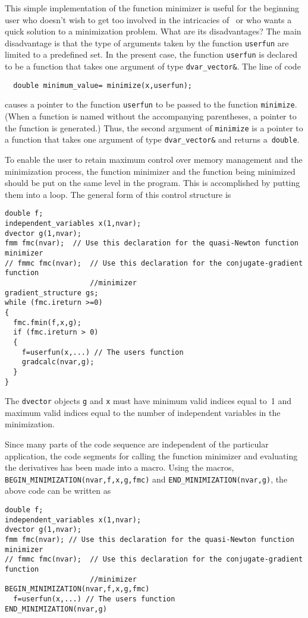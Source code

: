 \documentclass{admbmanual}
\begin{document}
This simple implementation of the function minimizer 
is useful for the beginning user who 
doesn't wish to get too involved in the intricacies of \scAD\ or
who wants a quick solution to a minimization problem. What are its
disadvantages? 
The main disadvantage is that the type of arguments taken by the function
\texttt{userfun} are limited to a predefined set. In the present case, the
function \texttt{userfun} is declared to be a function that takes
one argument of type \texttt{dvar\_vector\&}. The line of code 
\begin{lstlisting}
  double minimum_value= minimize(x,userfun);
\end{lstlisting}
causes a pointer to the function \texttt{userfun} to be passed
to the function \texttt{minimize}.  (When a function is named without the
accompanying parentheses, a pointer to the function is generated.)
Thus, the second argument of \texttt{minimize} is a pointer to
a function that takes one argument of type \texttt{dvar\_vector\&}
and returns a~\texttt{double}.

To enable the user to retain maximum control over memory management
and the minimization process,
the function minimizer and the 
function being minimized should be put on the same level in the program.
 This is accomplished
by putting them into a loop. The general form of this control
structure is
\begin{lstlisting}
double f;
independent_variables x(1,nvar);
dvector g(1,nvar);
fmm fmc(nvar);  // Use this declaration for the quasi-Newton function minimizer
// fmmc fmc(nvar);  // Use this declaration for the conjugate-gradient function 
                    //minimizer
gradient_structure gs;  
while (fmc.ireturn >=0)
{
  fmc.fmin(f,x,g);
  if (fmc.ireturn > 0)
  { 
    f=userfun(x,...) // The users function
    gradcalc(nvar,g);
  }
}
\end{lstlisting}

The \texttt{dvector} objects \texttt{g} and \texttt{x} must have
minimum valid indices equal to~1 and maximum valid indices equal to the
number of independent variables in the minimization.

Since many parts of the code sequence are independent of the 
particular application, the code segments for calling the function minimizer and
evaluating the derivatives has been made into a macro. Using the
macros, \texttt{BEGIN\_MINIMIZATION(nvar,f,x,g,fmc)} and 
\texttt{END\_MINIMIZATION(nvar,g)}, 
the above code can be written as
\begin{lstlisting}
double f;
independent_variables x(1,nvar);
dvector g(1,nvar);
fmm fmc(nvar); // Use this declaration for the quasi-Newton function minimizer
// fmmc fmc(nvar);  // Use this declaration for the conjugate-gradient function 
                    //minimizer
BEGIN_MINIMIZATION(nvar,f,x,g,fmc) 
  f=userfun(x,...) // The users function
END_MINIMIZATION(nvar,g) 
\end{lstlisting}
\end{document}
